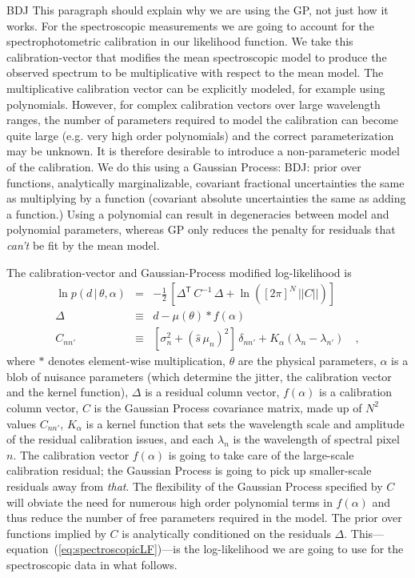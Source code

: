 \documentclass[iop,numberedappendix]{emulateapj}
\newcommand{\transpose}[1]{{#1}^{\!\mathsf T}}
\newcommand{\given}{\,|\,}
\renewcommand{\det}[1]{||{#1}||}
\begin{document}
{\color{blue} BDJ This paragraph should explain why we are using the
GP, not just how it works.}
For the spectroscopic measurements we are going to account for the
spectrophotometric calibration in our likelihood function.  We take
this calibration-vector that modifies the mean spectroscopic model to
produce the observed spectrum to be multiplicative with respect to the
mean model.  The multiplicative calibration vector can be explicitly
modeled, for example using polynomials.  However, for complex
calibration vectors over large wavelength ranges, the number of
parameters required to model the calibration can become quite large
(e.g. very high order polynomials) and the correct parameterization
may be unknown.  It is therefore desirable to introduce a
non-parameteric model of the calibration.  We do this using a Gaussian
Process: 
BDJ: prior over functions, analytically marginalizable, covariant
fractional uncertainties the same as multiplying by a function
(covariant absolute uncertainties the same as adding a function.)
Using a polynomial can result in degeneracies between model and
polynomial parameters, whereas GP only reduces the penalty for
residuals that {\it can't} be fit by the mean model.

The calibration-vector and Gaussian-Process modified log-likelihood is
\begin{eqnarray}\label{eq:spectroscopicLF_v2}
\ln p(d\given\theta,\alpha) &=&
                                -\frac{1}{2}\,\left[\transpose{\Delta}\,C^{-1}\,\Delta
                                + \ln([2\pi]^N\,\det{C}) \right]
\\
\Delta &\equiv& d - \mu(\theta) \ast f(\alpha) 
\\
C_{nn'} &\equiv& [\sigma_n^2 + (\hat{s} \, \mu_n)^2]\,\delta_{nn'} +
 K_\alpha(\lambda_n - \lambda_{n'}) 
\quad ,
\end{eqnarray}
where $\ast$ denotes element-wise multiplication,
$\theta$ are the physical parameters,
$\alpha$ is a blob of nuisance parameters
(which determine the jitter, the calibration vector and the kernel function),
$\Delta$ is a residual column vector,
$f(\alpha)$ is a calibration column vector,
$C$ is the Gaussian Process covariance matrix,
made up of $N^2$ values $C_{nn'}$,
$K_\alpha$ is a kernel function that sets the wavelength scale and
amplitude of the residual calibration issues,
and each $\lambda_n$ is the wavelength of spectral pixel $n$.
The calibration vector $f(\alpha)$ is going to take care of the
large-scale calibration residual; the Gaussian Process is going to
pick up smaller-scale residuals away from \emph{that}.
The flexibility of the Gaussian Process specified by $C$ will obviate
the need for numerous high order polynomial terms in $f(\alpha)$ and
thus reduce the number of free parameters required in the model.  The
prior over functions implied by $C$ is analytically conditioned on the
residuals $\Delta$.
This---equation~(\ref{eq:spectroscopicLF})---is the log-likelihood we
are going to use for the spectroscopic data in what follows.
\end{document}
